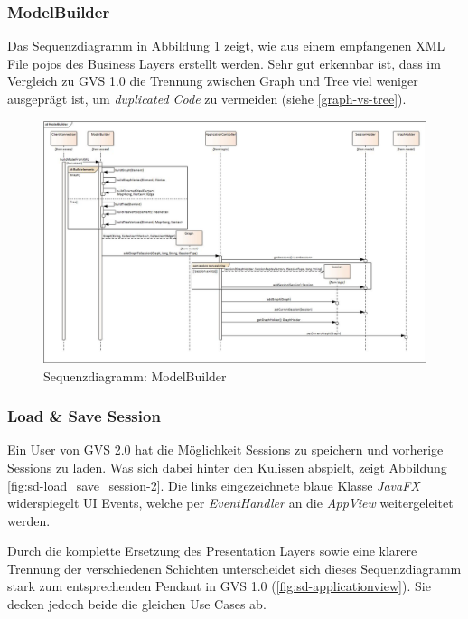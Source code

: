 \documentclass[11pt,a4paper,english,oneside]{book}
\numberwithin{equation}{chapter}
\begin{document}
	\subsubsection{ModelBuilder}
	Das Sequenzdiagramm in Abbildung \ref{fig:sd-modelbuilder-2} zeigt, wie aus einem empfangenen XML File \gls{pojo}s des Business Layers erstellt werden. Sehr gut erkennbar ist, dass im Vergleich zu GVS 1.0 die Trennung zwischen Graph und Tree viel weniger ausgeprägt ist, um \textit{duplicated Code} zu vermeiden (siehe \ref{graph-vs-tree}).
	\begin{figure}[h!]
		\centering
		\includegraphics[width=\linewidth]{assets/images/sequence_ModelBuilder}
		\caption{Sequenzdiagramm: ModelBuilder}
		\label{fig:sd-modelbuilder-2}
	\end{figure}	

	\subsubsection{Load \& Save Session}
	Ein User von GVS 2.0 hat die Möglichkeit Sessions zu speichern und vorherige Sessions zu laden. Was sich dabei hinter den Kulissen abspielt, zeigt Abbildung \ref{fig:sd-load_save_session-2}. Die links eingezeichnete blaue Klasse \textit{JavaFX} widerspiegelt UI Events, welche per \textit{EventHandler} an die \textit{AppView} weitergeleitet werden.
	
	Durch die komplette Ersetzung des Presentation Layers sowie eine klarere Trennung der verschiedenen Schichten unterscheidet sich dieses Sequenzdiagramm stark zum entsprechenden Pendant in GVS 1.0 (\ref{fig:sd-applicationview}). Sie decken jedoch beide die gleichen Use Cases ab.
	
\end{document}
